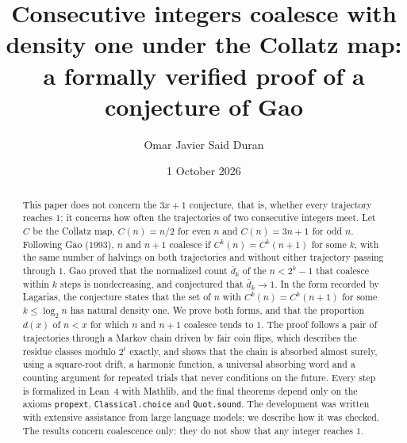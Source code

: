 \documentclass[11pt]{amsart}
\theoremstyle{definition}
\theoremstyle{remark}
\newcommand{\dbar}{\bar d}
\begin{document}
\title[Consecutive integers coalesce with density one]{Consecutive integers coalesce with density one under the Collatz map: a formally verified proof of a conjecture of Gao}

\author[O. J. Said Duran]{Omar Javier Said Duran}
\address{Independent researcher, Calama, Chile}

\date{1 October 2026}

\begin{abstract}
This paper does not concern the $3x+1$ conjecture, that is, whether every trajectory reaches $1$; it concerns how often the trajectories of two consecutive integers meet. Let $C$ be the Collatz map, $C(n)=n/2$ for even $n$ and $C(n)=3n+1$ for odd $n$. Following Gao (1993), $n$ and $n+1$ coalesce if $C^{k}(n)=C^{k}(n+1)$ for some $k$, with the same number of halvings on both trajectories and without either trajectory passing through $1$. Gao proved that the normalized count $\dbar_k$ of the $n<2^k-1$ that coalesce within $k$ steps is nondecreasing, and conjectured that $\dbar_k\to 1$. In the form recorded by Lagarias, the conjecture states that the set of $n$ with $C^{k}(n)=C^{k}(n+1)$ for some $k\le\log_2 n$ has natural density one. We prove both forms, and that the proportion $d(x)$ of $n<x$ for which $n$ and $n+1$ coalesce tends to $1$. The proof follows a pair of trajectories through a Markov chain driven by fair coin flips, which describes the residue classes modulo $2^t$ exactly, and shows that the chain is absorbed almost surely, using a square-root drift, a harmonic function, a universal absorbing word and a counting argument for repeated trials that never conditions on the future. Every step is formalized in Lean~4 with Mathlib, and the final theorems depend only on the axioms \texttt{propext}, \texttt{Classical.choice} and \texttt{Quot.sound}. The development was written with extensive assistance from large language models; we describe how it was checked. The results concern coalescence only: they do not show that any integer reaches $1$.
\end{abstract}


\maketitle
\end{document}
